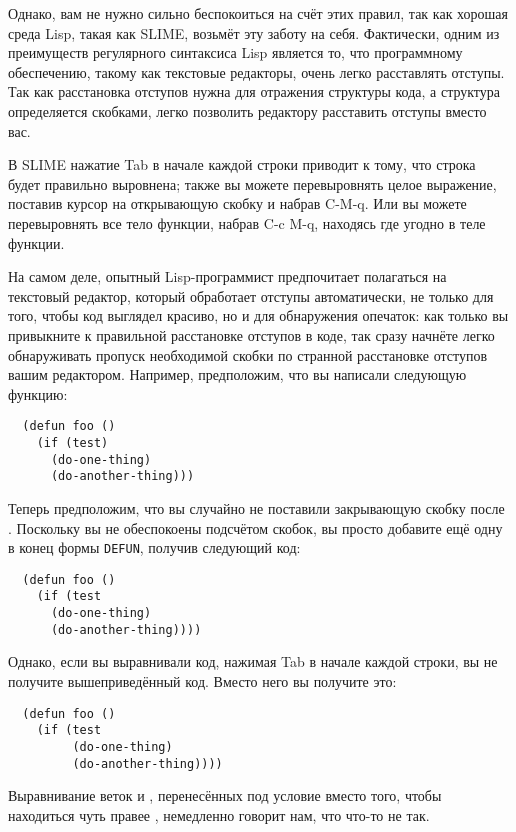 Однако, вам не нужно сильно беспокоиться на счёт этих правил, так как хорошая среда Lisp,
такая как SLIME, возьмёт эту заботу на себя. Фактически, одним из преимуществ регулярного
синтаксиса Lisp является то, что программному обеспечению, такому как текстовые редакторы,
очень легко расставлять отступы. Так как расстановка отступов нужна для отражения
структуры кода, а структура определяется скобками, легко позволить редактору расставить
отступы вместо вас.

В SLIME нажатие Tab в начале каждой строки приводит к тому, что строка будет правильно
выровнена; также вы можете перевыровнять целое выражение, поставив курсор на открывающую
скобку и набрав C-M-q. Или вы можете перевыровнять все тело функции, набрав C-c M-q,
находясь где угодно в теле функции.

На самом деле, опытный Lisp-программист предпочитает полагаться на текстовый редактор,
который обработает отступы автоматически, не только для того, чтобы код выглядел красиво,
но и для обнаружения опечаток: как только вы привыкните к правильной расстановке отступов
в коде, так сразу начнёте легко обнаруживать пропуск необходимой скобки по странной
расстановке отступов вашим редактором. Например, предположим, что вы написали следующую
функцию:

\begin{lstlisting}
  (defun foo ()
    (if (test)
      (do-one-thing)
      (do-another-thing)))
\end{lstlisting}

Теперь предположим, что вы случайно не поставили закрывающую скобку после
. Поскольку вы не обеспокоены подсчётом скобок, вы просто добавите ещё одну в
конец формы \lstinline{DEFUN}, получив следующий код:

\begin{lstlisting}
  (defun foo ()
    (if (test
      (do-one-thing)
      (do-another-thing))))
\end{lstlisting}

Однако, если вы выравнивали код, нажимая Tab в начале каждой строки, вы не получите
вышеприведённый код. Вместо него вы получите это:

\begin{lstlisting}
  (defun foo ()
    (if (test
         (do-one-thing)
         (do-another-thing))))
\end{lstlisting}

Выравнивание веток  и , перенесённых под условие вместо того, чтобы
находиться чуть правее , немедленно говорит нам, что что-то не так.

